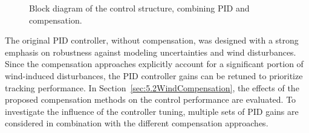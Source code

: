 \begin{figure}[htbp]
	
	\caption{Block diagram of the control structure, combining PID and compensation.}
	\label{fig:control_structure_with_compensation}
	
\end{figure}

The original PID controller, without compensation, was designed with a strong emphasis on robustness against modeling uncertainties and wind disturbances. Since the compensation approaches explicitly account for a significant portion of wind-induced disturbances, the PID controller gains can be retuned to prioritize tracking performance. In Section~\ref{sec:5.2WindCompensation}, the effects of the proposed compensation methods on the control performance are evaluated. To investigate the influence of the controller tuning, multiple sets of PID gains are considered in combination with the different compensation approaches.

